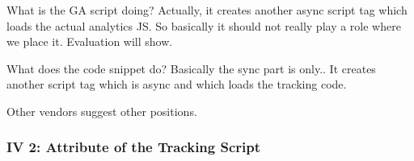 





What is the GA script doing?
Actually, it creates another async script tag which loads the actual analytics JS.
So basically it should not really play a role where we place it.
Evaluation will show.

What does the code snippet do?
Basically the sync part is only..
It creates another script tag which is async and which loads the tracking code.









Other vendors suggest other positions.









\subsubsection{IV 2: Attribute of the Tracking Script}

